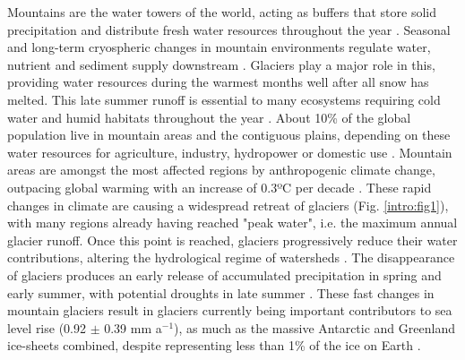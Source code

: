 Mountains are the water towers of the world, acting as buffers that store solid precipitation and distribute fresh water resources throughout the year \citep{immerzeel_importance_2020}. Seasonal and long-term cryospheric changes in mountain environments regulate water, nutrient and sediment supply downstream \citep{huss_toward_2017}. Glaciers play a major role in this, providing water resources during the warmest months well after all snow has melted. This late summer runoff is essential to many ecosystems requiring cold water and humid habitats throughout the year \citep{cauvy-fraunie_global_2019, carlson_monitoring_2020}. About 10\% of the global population live in mountain areas and the contiguous plains, depending on these water resources for agriculture, industry, hydropower or domestic use \citep{huss_global-scale_2018,farinotti_large_2019}.  Mountain areas are amongst the most affected regions by anthropogenic climate change, outpacing global warming  with an increase of 0.3ºC per decade \citep{ipcc_climate_2018}. These rapid changes in climate are causing a widespread retreat of glaciers (Fig. \ref{intro:fig1}), with many regions already having reached "peak water", i.e. the maximum annual glacier runoff. Once this point is reached, glaciers progressively reduce their water contributions, altering the hydrological regime of watersheds \citep{huss_global-scale_2018}. The disappearance of glaciers produces an early release of accumulated precipitation in spring and early summer, with potential droughts in late summer \citep{brunner_future_2019}. These fast changes in mountain glaciers result in glaciers currently being important contributors to sea level rise (0.92 $\pm$ 0.39 mm a$^{-1}$), as much as the massive Antarctic and Greenland ice-sheets combined, despite representing less than 1\% of the ice on Earth \citep{zemp_global_2019, hock_glaciermip_2019}. 


